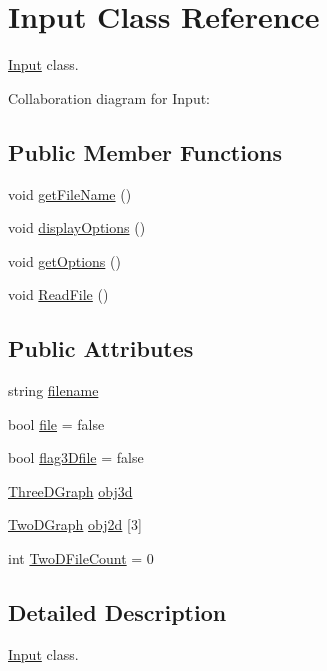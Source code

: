 \hypertarget{classInput}{}\section{Input Class Reference}
\label{classInput}


\hyperlink{classInput}{Input} class.  




Collaboration diagram for Input\+:
\subsection*{Public Member Functions}
\begin{DoxyCompactItemize}
\item 
void \hyperlink{classInput_abb4311267ded94768e6df9cb88b179bb}{get\+File\+Name} ()
\item 
void \hyperlink{classInput_a29639b68a8a421e0cb1b576eae3f8259}{display\+Options} ()
\item 
void \hyperlink{classInput_af0a5bad322752da31bcd7b1e2d99d611}{get\+Options} ()
\item 
void \hyperlink{classInput_a9d9395f68b01faa00f962791878723a2}{Read\+File} ()
\end{DoxyCompactItemize}
\subsection*{Public Attributes}
\begin{DoxyCompactItemize}
\item 
string \hyperlink{classInput_af296359065236ac9139aab7736d6844d}{filename}
\item 
bool \hyperlink{classInput_ad073fa115ead2e8b7492214215ebd22d}{file} = false
\item 
bool \hyperlink{classInput_a64eaf835cd488ddd44e9e77fc9c917cf}{flag3\+Dfile} = false
\item 
\hyperlink{classThreeDGraph}{Three\+D\+Graph} \hyperlink{classInput_ab12646f36b9b1eeeb3aa09adf8cec077}{obj3d}
\item 
\hyperlink{classTwoDGraph}{Two\+D\+Graph} \hyperlink{classInput_a9564e8dcf0ba881f46a89e51840836d9}{obj2d} \mbox{[}3\mbox{]}
\item 
int \hyperlink{classInput_a82141fe9142aec447f9ef52fd2f78c73}{Two\+D\+File\+Count} = 0
\end{DoxyCompactItemize}


\subsection{Detailed Description}
\hyperlink{classInput}{Input} class. 

